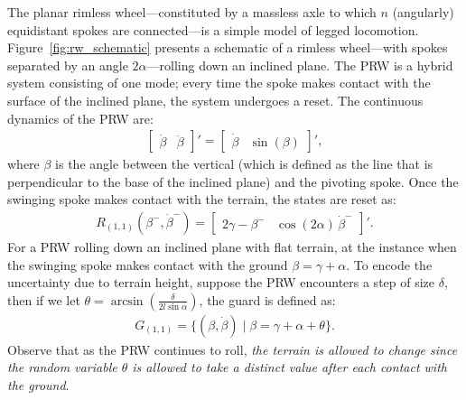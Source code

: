 \begin{example}
\label{example:rw}
The planar rimless wheel---constituted by a massless axle to which $n$ (angularly) equidistant spokes are connected---is a simple model of legged locomotion.
Figure~\ref{fig:rw_schematic} presents a schematic of a rimless wheel---with spokes separated by an angle $2\alpha$---rolling down an inclined plane.
The PRW is a hybrid system consisting of one mode; every time the spoke makes contact with the surface of the inclined plane, the system undergoes a reset.
The continuous dynamics of the PRW are:
\begin{align}
  \begin{bmatrix}
    \dot \beta& \ddot\beta
  \end{bmatrix}'=\begin{bmatrix}
    \dot\beta&\sin(\beta)
  \end{bmatrix}',
\end{align}
where $\beta$ is the angle between the vertical (which is defined as the line that is perpendicular to the base of the inclined plane) and the pivoting spoke.
Once the swinging spoke makes contact with the terrain, the states are reset as:
\begin{align}
R_{(1,1)}(\beta^-,\dot \beta^-)=\begin{bmatrix}
    2\gamma-\beta^-&
    \cos(2\alpha)\,\dot\beta^-
  \end{bmatrix}'.
\end{align}
For a PRW rolling down an inclined plane with flat terrain, at the instance when the swinging spoke makes contact with the ground $\beta = \gamma + \alpha$.
To encode the uncertainty due to terrain height, suppose the PRW encounters a step of size $\delta$, then if we let $\theta =  \arcsin \left( \frac{\delta}{2 l \sin \alpha} \right)$, the guard is defined as:
\begin{align}
G_{(1,1)}=\{ (\beta, \dot{\beta})\mid \beta=\gamma+\alpha+\theta\}.
\end{align}
Observe that as the PRW continues to roll, \emph{the terrain is allowed to change since the random variable $\theta$ is allowed to take a distinct value after each contact with the ground}.
\end{example}

